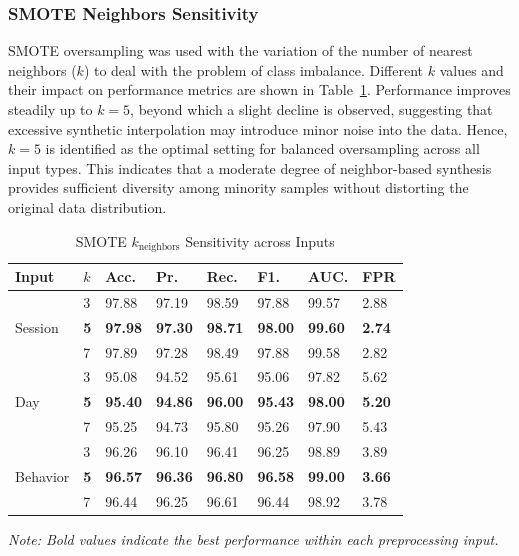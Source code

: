\subsubsection{SMOTE Neighbors Sensitivity}
SMOTE oversampling was used with the variation of the number of nearest neighbors ($k$) to deal with the problem of class imbalance. Different $k$ values and their impact on performance metrics are shown in Table~\ref{tab:smote_k_sensitivity_all}. 
Performance improves steadily up to $k=5$, beyond which a slight decline is observed, suggesting that excessive synthetic interpolation may introduce minor noise into the data. Hence, $k=5$ is identified as the optimal setting for balanced oversampling across all input types. 
This indicates that a moderate degree of neighbor-based synthesis provides sufficient diversity among minority samples without distorting the original data distribution.





\begin{table}[!ht]
\centering
\caption{SMOTE $k_{\text{neighbors}}$ Sensitivity across Inputs}
\label{tab:smote_k_sensitivity_all}
\renewcommand{\arraystretch}{1.3} %
\setlength{\tabcolsep}{5pt}      %
\small
\begin{tabular}{|l|l|l|l|l|l|l|l|}
\hline
\textbf{Input} & \textbf{$k$} & \textbf{Acc.} & \textbf{Pr.} & \textbf{Rec.} & \textbf{F1.} & \textbf{AUC.} & \textbf{FPR } \\
\hline

\multirow{3}{*}{Session} 
 & 3 & 97.88 & 97.19 & 98.59 & 97.88 & 99.57 & 2.88 \\ \cline{2-8}
 & \textbf{5} & \textbf{97.98} & \textbf{97.30} & \textbf{98.71} & \textbf{98.00} & \textbf{99.60} & \textbf{2.74} \\ \cline{2-8}
 & 7 & 97.89 & 97.28 & 98.49 & 97.88 & 99.58 & 2.82 \\
\hline

\multirow{3}{*}{Day} 
 & 3 & 95.08 & 94.52 & 95.61 & 95.06 & 97.82 & 5.62 \\ \cline{2-8}
 & \textbf{5} & \textbf{95.40} & \textbf{94.86} & \textbf{96.00} & \textbf{95.43} & \textbf{98.00} & \textbf{5.20} \\ \cline{2-8}
 & 7 & 95.25 & 94.73 & 95.80 & 95.26 & 97.90 & 5.43 \\
\hline

\multirow{3}{*}{Behavior} 
 & 3 & 96.26 & 96.10 & 96.41 & 96.25 & 98.89 & 3.89 \\ \cline{2-8}
 & \textbf{5} & \textbf{96.57} & \textbf{96.36} & \textbf{96.80} & \textbf{96.58} & \textbf{99.00} & \textbf{3.66} \\ \cline{2-8}
 & 7 & 96.44 & 96.25 & 96.61 & 96.44 & 98.92 & 3.78 \\
\hline
\end{tabular}

\vspace{2mm}
\scriptsize{\textit{Note: Bold values indicate the best performance within each preprocessing input.}}
\end{table}



